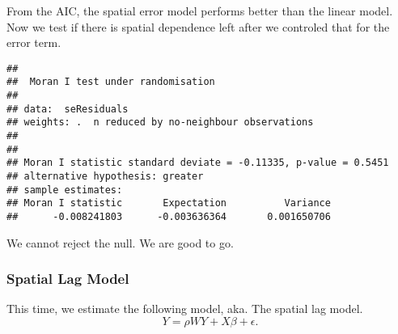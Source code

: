 \documentclass[
]{article}
\newenvironment{Shaded}{\begin{snugshade}}{\end{snugshade}}
\newcommand{\AttributeTok}[1]{\textcolor[rgb]{0.77,0.63,0.00}{#1}}
\newcommand{\CommentTok}[1]{\textcolor[rgb]{0.56,0.35,0.01}{\textit{#1}}}
\newcommand{\ConstantTok}[1]{\textcolor[rgb]{0.00,0.00,0.00}{#1}}
\newcommand{\DecValTok}[1]{\textcolor[rgb]{0.00,0.00,0.81}{#1}}
\newcommand{\FunctionTok}[1]{\textcolor[rgb]{0.00,0.00,0.00}{#1}}
\newcommand{\NormalTok}[1]{#1}
\newcommand{\OtherTok}[1]{\textcolor[rgb]{0.56,0.35,0.01}{#1}}
\newcommand{\SpecialCharTok}[1]{\textcolor[rgb]{0.00,0.00,0.00}{#1}}
\begin{document}
From the AIC, the spatial error model performs better than the linear
model. Now we test if there is spatial dependence left after we
controled that for the error term.

\begin{Shaded}
\end{Shaded}

\begin{verbatim}
## 
##  Moran I test under randomisation
## 
## data:  seResiduals  
## weights: .  n reduced by no-neighbour observations
##   
## 
## Moran I statistic standard deviate = -0.11335, p-value = 0.5451
## alternative hypothesis: greater
## sample estimates:
## Moran I statistic       Expectation          Variance 
##      -0.008241803      -0.003636364       0.001650706
\end{verbatim}

We cannot reject the null. We are good to go.

\hypertarget{spatial-lag-model}{%
\subsubsection{Spatial Lag Model}\label{spatial-lag-model}}

This time, we estimate the following model, aka. The spatial lag model.
\[Y = \rho WY + X\beta + \epsilon.\]
\end{document}
